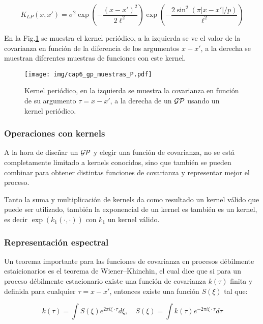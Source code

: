 \begin{equation}\label{eq:gp_kernel_lp}
	K_{LP}(x, x') = \sigma^2  \exp\left(-\frac{\left(x- x' \right)^2}{2\ell^2 } \right) \exp\left(-\frac{2\sin^2\left(\pi |x- x'| / p \right)}{\ell^2 } \right)
\end{equation}

En la Fig.\ref{fig:gp_7} se muestra el kernel periódico, a la izquierda se ve el valor de la covarianza en función de la diferencia de los argumentos $x-x'$, a la derecha se muestran diferentes muestras de funciones con este kernel.

\begin{figure}[H]
	\centering
	\texttt{[image: img/cap6\_gp\_muestras\_P.pdf]}
	\caption{Kernel periódico, en la izquierda se muestra la covarianza en función de su argumento $\tau=x-x'$, a la derecha de un $\mathcal{GP}$ usando un kernel periódico.}
	\label{fig:gp_7}
\end{figure}

\subsubsection{Operaciones con kernels}
A la hora de diseñar un $\mathcal{GP}$ y elegir una función de covarianza, no se está completamente limitado a kernels conocidos, sino que también se pueden combinar para obtener distintas funciones de covarianza y representar mejor el proceso.

Tanto la suma y multiplicación de kernels da como resultado un kernel válido que puede ser utilizado, también la exponencial de un kernel es también es un kernel, es decir $\exp(k_1(\cdot, \cdot))$ con $k_1$ un kernel válido.

\subsubsection{Representación espectral}
Un teorema importante para las funciones de covarianza en procesos débilmente estaicionarios es el teorema de Wiener–Khinchin, el cual dice que si para un proceso débilmente estacionario existe una función de covarianza $k(\tau)$ finita y definida para cualquier $\tau=x-x'$, entonces existe una función $S(\xi)$ tal que:

\begin{equation}\label{eq:gp_spectral}
	k(\tau) = \int S(\xi)e^{2\pi i \xi \cdot \tau} d\xi, \quad S(\xi)=\int k(\tau)e^{-2\pi i \xi \cdot \tau} d\tau
\end{equation}

